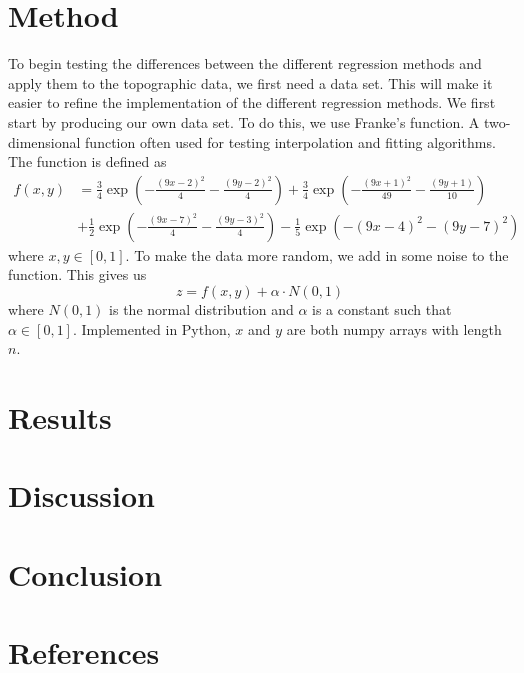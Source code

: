 \documentclass{article}
\begin{document}
\section{Method}
To begin testing the differences between the different regression methods and apply them to the topographic data, we first need a data set. This will make it easier to refine the implementation of the different regression methods. We first start by producing our own data set. To do this, we use Franke's function. A two-dimensional function often used for testing interpolation and fitting algorithms. The function is defined as 
\begin{equation*}
    \begin{split}
        f(x,y) & = \frac{3}{4}\exp\left(-\frac{(9x-2)^2}{4} - \frac{(9y-2)^2}{4}\right) + \frac{3}{4}\exp\left(-\frac{(9x+1)^2}{49} - \frac{(9y+1)}{10}\right) \\
        & + \frac{1}{2}\exp\left(-\frac{(9x-7)^2}{4} - \frac{(9y-3)^2}{4}\right) - \frac{1}{5}\exp\left(-(9x-4)^2 - (9y-7)^2\right)
    \end{split}
\end{equation*}
where $x,y \in [0,1]$. To make the data more random, we add in some noise to the function. This gives us
\begin{equation*}
    z = f(x,y) + \alpha \cdot N(0,1)
\end{equation*}
where $N(0,1)$ is the normal distribution and $\alpha$ is a constant such that $\alpha \in [0,1]$. Implemented in Python, $x$ and $y$ are both numpy arrays with length $n$.

\section{Results}

\section{Discussion}

\section{Conclusion}

\section{References}

\end{document}

